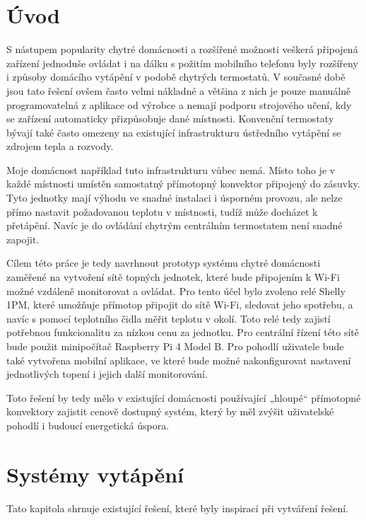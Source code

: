 \chapter{Úvod}

S nástupem popularity chytré domácnosti a rozšířené možnosti veškerá připojená zařízení jednoduše ovládat i na dálku s požitím mobilního telefonu byly rozšířeny i způsoby domácího vytápění v podobě chytrých termostatů. V současné době jsou tato řešení ovšem často velmi nákladné a většina z nich je pouze manuálně programovatelná z aplikace od výrobce a nemají podporu strojového učení, kdy se zařízení automaticky přizpůsobuje dané místnosti. Konvenční termostaty bývají také často omezeny na existující infrastrukturu ústředního vytápění se zdrojem tepla a rozvody.

Moje domácnost například tuto infrastrukturu vůbec nemá. Místo toho je v každé místnosti umístěn samostatný přímotopný konvektor připojený do zásuvky. Tyto jednotky mají výhodu ve snadné instalaci i úsporném provozu, ale nelze přímo nastavit požadovanou teplotu v místnosti, tudíž může docházet k přetápění. Navíc je do ovládání chytrým centrálním termostatem není snadné zapojit.

Cílem této práce je tedy navrhnout prototyp systému chytré domácnosti zaměřené na vytvoření sítě topných jednotek, které bude připojením k Wi-Fi možné vzdáleně monitorovat a ovládat. Pro tento účel bylo zvoleno relé Shelly 1PM, které umožňuje přímotop připojit do sítě Wi-Fi, sledovat jeho spotřebu, a navíc s pomocí teplotního čidla měřit teplotu v okolí. Toto relé tedy zajistí potřebnou funkcionalitu za nízkou cenu za jednotku. Pro centrální řízení této sítě bude použit minipočítač Raspberry Pi 4 Model B. Pro pohodlí uživatele bude také vytvořena mobilní aplikace, ve které bude možné nakonfigurovat nastavení jednotlivých topení i jejich další monitorování.

Toto řešení by tedy mělo v existující domácnosti používající „hloupé“ přímotopné konvektory zajistit cenově dostupný systém, který by měl zvýšit uživatelské pohodlí i budoucí energetická úspora.

\chapter{Systémy vytápění}
\label{teorie}
Tato kapitola shrnuje existující řešení, které byly inspirací při vytváření řešení.

